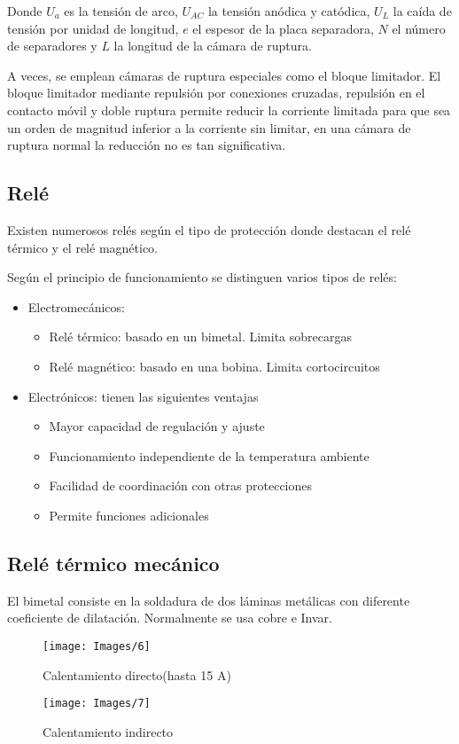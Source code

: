 Donde $U_a$ es la tensión de arco, $U_{AC} $ la tensión anódica y catódica, $U_L$ la caída de tensión por unidad de longitud, $e$ el espesor de la placa separadora, $N$ el número de separadores y $L$ la longitud de la cámara de ruptura. 
\newline

A veces, se emplean cámaras de ruptura especiales como el bloque limitador. El bloque limitador mediante repulsión por conexiones cruzadas, repulsión en el contacto móvil y doble ruptura permite reducir la corriente limitada para que sea un orden de magnitud inferior a la corriente sin limitar, en una cámara de ruptura normal la reducción no es tan significativa.
\subsection{Relé}
Existen numerosos relés según el tipo de protección donde destacan el relé térmico y el relé magnético.
\newline

Según el principio de funcionamiento se distinguen varios tipos de relés:
\begin{itemize}
	\item Electromecánicos:
	\begin{itemize}
		\item Relé térmico: basado en un bimetal. Limita sobrecargas
		\item Relé magnético: basado en una bobina. Limita cortocircuitos
	\end{itemize}
	\item Electrónicos: tienen las siguientes ventajas
	\begin{itemize}
		\item Mayor capacidad de regulación y ajuste
		\item Funcionamiento independiente de la temperatura ambiente
		\item Facilidad de coordinación con otras protecciones
		\item Permite funciones adicionales
	\end{itemize}
\end{itemize}
\subsection{Relé térmico mecánico}
El bimetal consiste en la soldadura de dos láminas metálicas con diferente coeficiente de dilatación. Normalmente se usa cobre e Invar.
\begin{figure}[H]
	\centering
	\begin{minipage}{0.45\textwidth}
			\texttt{[image: Images/6]}
			\caption{Calentamiento directo\newline (hasta 15 A)}
			\label{fig:6}
	\end{minipage}
	\begin{minipage}{0.45\textwidth}
		\centering
		\texttt{[image: Images/7]}
		\caption{Calentamiento indirecto}
		\label{fig:7}
	\end{minipage}
\end{figure}

